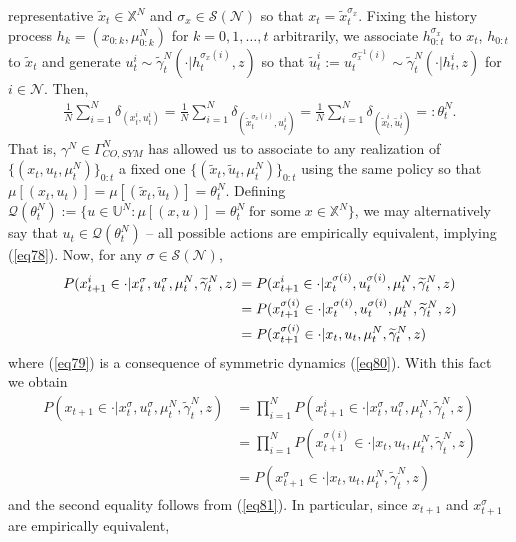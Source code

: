 \documentclass[12pt, oneside]{report}
\newcommand{\mbb}[1]{\mathbb{#1}}
\newcommand{\1}[1]{\mathbbm{1}_{\{#1\}}}
\newcommand{\mc}[1]{\mathcal{#1}}
\theoremstyle{definition}
\begin{document}
representative $\widetilde{x}_t\in\mbb{X}^N$ and $\sigma_x\in\mc{S}(\mc{N})$ so that $x_t=\widetilde{x}_t^{\sigma_x}$. Fixing the history process $h_k=(x_{0:k},\mu^N_{0:k})$ for $k=0,1,\dots,t$ arbitrarily, we associate $h^{\sigma_x}_{0:t}$ to $x_t$, $h_{0:t}$ to $\widetilde{x}_{t}$
and generate $u^i_t\sim\widetilde{\gamma}^N_t(\cdot|h^{\sigma_x(i)}_t,z)$ so that $\widetilde{u}^i_t:=u^{\sigma_x^{-1}(i)}_t\sim\widetilde{\gamma}^N_t(\cdot|h^i_t,z)$ for $i\in\mc{N}$. Then,
\begin{align*}
    \frac{1}{N}\sum_{i=1}^N\delta_{(x^i_t,u^i_t)}=\frac{1}{N}\sum_{i=1}^N\delta_{(\widetilde{x}^{\sigma_x(i)}_t,u^{i}_t)}=\frac{1}{N}\sum_{i=1}^N\delta_{(\widetilde{x}^i_t,\widetilde{u}^i_t)}=:\theta^N_t.
\end{align*}
That is, $\gamma^N\in\Gamma^{N}_{CO,\mathit{SYM}}$ has allowed us to associate to any realization of $\{(x_t,u_t,\mu^N_t)\}_{0:t}$ a fixed one $\{(\widetilde{x}_t,\widetilde{u}_t,\mu^N_t)\}_{0:t}$ using the same policy so that
$\mu[(x_t,u_t)]=\mu[(\widetilde{x}_t,\widetilde{u}_t)]=\theta^N_t$. Defining $\mc{Q}(\theta^N_t):=\{u\in\mbb{U}^N:\mu[(x,u)]=\theta^N_t\;\text{for some}\;x\in\mbb{X}^N\}$, we may alternatively say that $u_t\in\mc{Q}(\theta^N_t)$ --
all possible actions are empirically equivalent, implying (\ref{eq78}). Now, for any $\sigma\in\mc{S}(\mc{N})$,
\begin{align}
    P(x^i_{t+1}\in\cdot|x^\sigma_t,u^\sigma_t,\mu^N_t,\widetilde{\gamma}^N_t,z)&=P(x^i_{t+1}\in\cdot|x^{\sigma(i)}_t,u^{\sigma(i)}_t,\mu^N_t,\widetilde{\gamma}^N_t,z)\notag\\
    &=P(x^{\sigma(i)}_{t+1}\in\cdot|x^{\sigma(i)}_t,u^{\sigma(i)}_t,\mu^N_t,\widetilde{\gamma}^N_t,z)\label{eq79}\\
    &=P(x^{\sigma(i)}_{t+1}\in\cdot|x_t,u_t,\mu^N_t,\widetilde{\gamma}^N_t,z)\label{eq81}
\end{align}
where (\ref{eq79}) is a consequence of symmetric dynamics (\ref{eq80}). With this fact we obtain
\begin{align*}
    P(x_{t+1}\in\cdot|x^\sigma_t,u^\sigma_t,\mu^N_t,\widetilde{\gamma}^N_t,z)&=\prod_{i=1}^NP(x^i_{t+1}\in\cdot|x^\sigma_t,u^\sigma_t,\mu^N_t,\widetilde{\gamma}^N_t,z)\\
    &=\prod_{i=1}^NP(x^{\sigma(i)}_{t+1}\in\cdot|x_t,u_t,\mu^N_t,\widetilde{\gamma}^N_t,z)\\
    &=P(x^\sigma_{t+1}\in\cdot|x_t,u_t,\mu^N_t,\widetilde{\gamma}^N_t,z)
\end{align*}
and the second equality follows from (\ref{eq81}). In particular, since $x_{t+1}$ and $x^\sigma_{t+1}$ are empirically equivalent,
\end{document}
